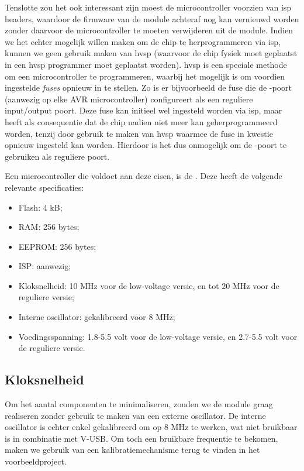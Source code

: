 \documentclass[verslag.tex]{subfiles}
\begin{document}
Tenslotte zou het ook interessant zijn moest de microcontroller voorzien van \ac{isp} headers, waardoor de firmware van de module achteraf nog kan vernieuwd worden zonder daarvoor de microcontroller te moeten verwijderen uit de module. Indien we het echter mogelijk willen maken om de chip te herprogrammeren via \ac{isp}, kunnen we geen gebruik maken van \ac{hvsp} (waarvoor de chip fysiek moet geplaatst in een \ac{hvsp} programmer moet geplaatst worden). \ac{hvsp} is een speciale methode om een microcontroller te programmeren, waarbij het mogelijk is om voordien ingestelde \emph{fuses} opnieuw in te stellen. Zo is er bijvoorbeeld de fuse die de -poort (aanwezig op elke AVR microcontroller) configureert als een reguliere input/output poort. Deze fuse kan initieel wel ingesteld worden via \ac{isp}, maar heeft als consequentie dat de chip nadien niet meer kan geherprogrammeerd worden, tenzij door gebruik te maken van \ac{hvsp} waarmee de fuse in kwestie opnieuw ingesteld kan worden. Hierdoor is het dus onmogelijk om de -poort te gebruiken als reguliere poort.

Een microcontroller die voldoet aan deze eisen, is de . Deze heeft de volgende relevante specificaties:
\begin{itemize}
\item Flash: 4 kB;
\item RAM: 256 bytes;
\item EEPROM: 256 bytes;
\item ISP: aanwezig;
\item Kloksnelheid: 10 MHz voor de low-voltage versie, en tot 20 MHz voor de reguliere versie;
\item Interne oscillator: gekalibreerd voor 8 MHz;
\item Voedingsspanning: 1.8-5.5 volt voor de low-voltage versie, en 2.7-5.5 volt voor de reguliere versie.
\end{itemize}

\subsection{Kloksnelheid}

Om het aantal componenten te minimaliseren, zouden we de module graag realiseren zonder gebruik te maken van een externe oscillator. De interne oscillator is echter enkel gekalibreerd om op 8 MHz te werken, wat niet bruikbaar is in combinatie met V-USB. Om toch een bruikbare frequentie te bekomen, maken we gebruik van een kalibratiemechanisme terug te vinden in het  voorbeeldproject.
\end{document}
